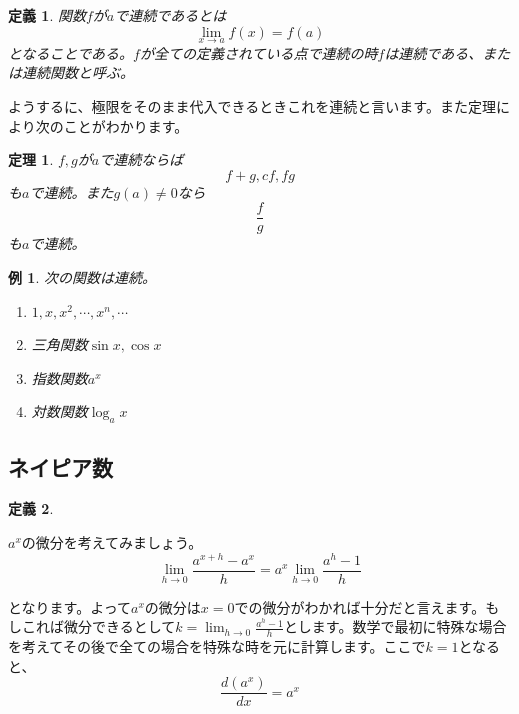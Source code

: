 \documentclass{ltjsarticle}
\newtheorem{theorem}{定理}[section]
\newtheorem{definition}{定義}[section]
\newtheorem{example}{例}[section]
\begin{document}
\begin{definition}
関数$f$が$a$で連続であるとは
\begin{equation*}
\lim_{x\to a}f(x) = f(a)
\end{equation*}
となることである。$f$が全ての定義されている点で連続の時$f$は連続である、または連続関数と呼ぶ。
\end{definition}

ようするに、極限をそのまま代入できるときこれを連続と言います。また定理\label{theorem_limit_properties}により次のことがわかります。
\begin{theorem}
$f,g$が$a$で連続ならば
\begin{equation*}
f+g,cf,fg
\end{equation*}
も$a$で連続。また$g(a)\not=0$なら
\begin{equation*}
{\frac f g}
\end{equation*}
も$a$で連続。
\end{theorem}

\begin{example}次の関数は連続。
\label{example_continuous_function}
\begin{enumerate}[1).]
\item $1,x,x^2,\cdots,x^n,\cdots$
\item 三角関数$\sin x,\cos x$
\item 指数関数$a^x$
\item 対数関数$\log_a x$
\end{enumerate}
\end{example}
\subsection{ネイピア数}
\begin{definition}

\end{definition}

$a^x$の微分を考えてみましょう。
\begin{equation*}
\lim_{h\to 0}{\frac {a^{x+h}-a^x} {h}} = a^x\lim_{h\to0}{\frac {a^h-1} h}
\end{equation*}

となります。よって$a^x$の微分は$x=0$での微分がわかれば十分だと言えます。もしこれば微分できるとして$k=\lim_{h\to0}{\frac {a^h-1} h}$とします。数学で最初に特殊な場合を考えてその後で全ての場合を特殊な時を元に計算します。ここで$k=1$となると、
\begin{equation*}
{\frac {d(a^x)} {dx}} = a^x
\end{equation*}
\end{document}
